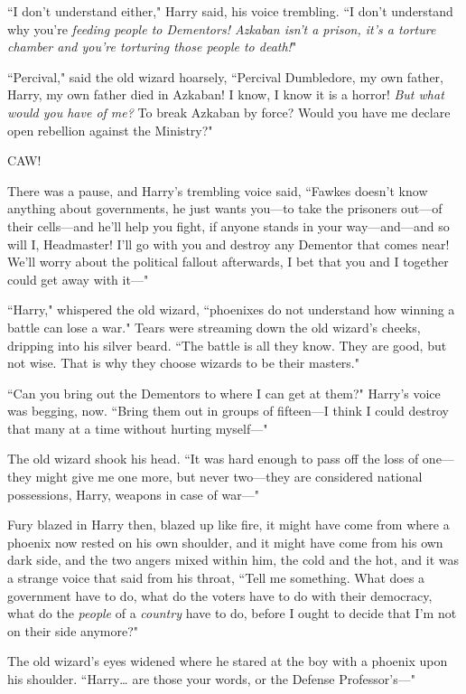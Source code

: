 ``I don't understand either," Harry said, his voice trembling. ``I don't understand why you're \emph{feeding people to Dementors! Azkaban isn't a prison, it's a torture chamber and you're torturing those people to \emph{death}!}"

``Percival," said the old wizard hoarsely, ``Percival Dumbledore, my own father, Harry, my own father died in Azkaban! I know, I know it is a horror! \emph{But what would you have of me?} To break Azkaban by force? Would you have me declare open rebellion against the Ministry?"

CAW!

There was a pause, and Harry's trembling voice said, ``Fawkes doesn't know anything about governments, he just wants you---to take the prisoners out---of their cells---and he'll help you fight, if anyone stands in your way---and---and so will I, Headmaster! I'll go with you and destroy any Dementor that comes near! We'll worry about the political fallout afterwards, I bet that you and I together could get away with it---"

``Harry," whispered the old wizard, ``phoenixes do not understand how winning a battle can lose a war." Tears were streaming down the old wizard's cheeks, dripping into his silver beard. ``The battle is all they know. They are good, but not wise. That is why they choose wizards to be their masters."

``Can you bring out the Dementors to where I can get at them?" Harry's voice was begging, now. ``Bring them out in groups of fifteen---I think I could destroy that many at a time without hurting myself---"

The old wizard shook his head. ``It was hard enough to pass off the loss of one---they might give me one more, but never two---they are considered national possessions, Harry, weapons in case of war---"

Fury blazed in Harry then, blazed up like fire, it might have come from where a phoenix now rested on his own shoulder, and it might have come from his own dark side, and the two angers mixed within him, the cold and the hot, and it was a strange voice that said from his throat, ``Tell me something. What does a government have to do, what do the voters have to do with their democracy, what do the \emph{people} of a \emph{country} have to do, before I ought to decide that I'm not on their side anymore?"

The old wizard's eyes widened where he stared at the boy with a phoenix upon his shoulder. ``Harry{\ldots} are those your words, or the Defense Professor's---"

